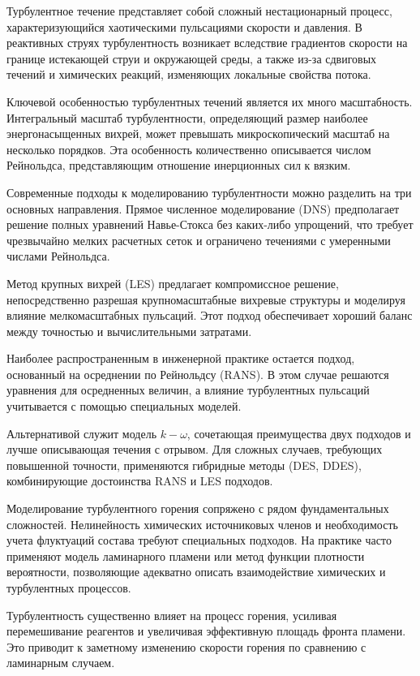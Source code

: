 Турбулентное течение представляет собой сложный нестационарный процесс, характеризующийся хаотическими пульсациями скорости и давления. В реактивных струях турбулентность возникает вследствие градиентов скорости на границе истекающей струи и окружающей среды, а также из-за сдвиговых течений и химических реакций, изменяющих локальные свойства потока.

Ключевой особенностью турбулентных течений является их много масштабность. Интегральный масштаб турбулентности, определяющий размер наиболее энергонасыщенных вихрей, может превышать микроскопический масштаб на несколько порядков. Эта особенность количественно описывается числом Рейнольдса, представляющим отношение инерционных сил к вязким.

Современные подходы к моделированию турбулентности можно разделить на три основных направления. Прямое численное моделирование (DNS) предполагает решение полных уравнений Навье-Стокса без каких-либо упрощений, что требует чрезвычайно мелких расчетных сеток и ограничено течениями с умеренными числами Рейнольдса.

Метод крупных вихрей (LES) предлагает компромиссное решение, непосредственно разрешая крупномасштабные вихревые структуры и моделируя влияние мелкомасштабных пульсаций. Этот подход обеспечивает хороший баланс между точностью и вычислительными затратами.

Наиболее распространенным в инженерной практике остается подход, основанный на осреднении по Рейнольдсу (RANS). В этом случае решаются уравнения для осредненных величин, а влияние турбулентных пульсаций учитывается с помощью специальных моделей.

Альтернативой служит модель $k-\omega$, сочетающая преимущества двух подходов и лучше описывающая течения с отрывом. Для сложных случаев, требующих повышенной точности, применяются гибридные методы (DES, DDES), комбинирующие достоинства RANS и LES подходов.

Моделирование турбулентного горения сопряжено с рядом фундаментальных сложностей. Нелинейность химических источниковых членов и необходимость учета флуктуаций состава требуют специальных подходов. На практике часто применяют модель ламинарного пламени или метод функции плотности вероятности, позволяющие адекватно описать взаимодействие химических и турбулентных процессов.

Турбулентность существенно влияет на процесс горения, усиливая перемешивание реагентов и увеличивая эффективную площадь фронта пламени. Это приводит к заметному изменению скорости горения по сравнению с ламинарным случаем.

